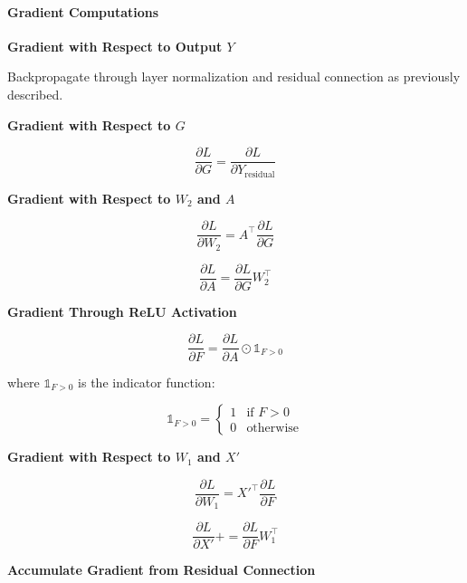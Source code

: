 \documentclass{article}
\begin{document}
\paragraph{Gradient Computations}

\textbf{Gradient with Respect to Output $Y$}

Backpropagate through layer normalization and residual connection as previously described.

\textbf{Gradient with Respect to $G$}

\begin{equation}
    \frac{\partial L}{\partial G} = \frac{\partial L}{\partial Y_{\text{residual}}}
\end{equation}

\textbf{Gradient with Respect to $W_2$ and $A$}

\begin{equation}
    \frac{\partial L}{\partial W_2} = A^\top \frac{\partial L}{\partial G}
\end{equation}

\begin{equation}
    \frac{\partial L}{\partial A} = \frac{\partial L}{\partial G} W_2^\top
\end{equation}

\textbf{Gradient Through ReLU Activation}

\begin{equation}
    \frac{\partial L}{\partial F} = \frac{\partial L}{\partial A} \odot \mathbb{1}_{F > 0}
\end{equation}

where $\mathbb{1}_{F > 0}$ is the indicator function:

\[
\mathbb{1}_{F > 0} = \begin{cases}
1 & \text{if } F > 0 \\
0 & \text{otherwise}
\end{cases}
\]

\textbf{Gradient with Respect to $W_1$ and $X'$}

\begin{equation}
    \frac{\partial L}{\partial W_1} = {X'}^\top \frac{\partial L}{\partial F}
\end{equation}

\begin{equation}
    \frac{\partial L}{\partial X'} += \frac{\partial L}{\partial F} W_1^\top
\end{equation}

\textbf{Accumulate Gradient from Residual Connection}
\end{document}
